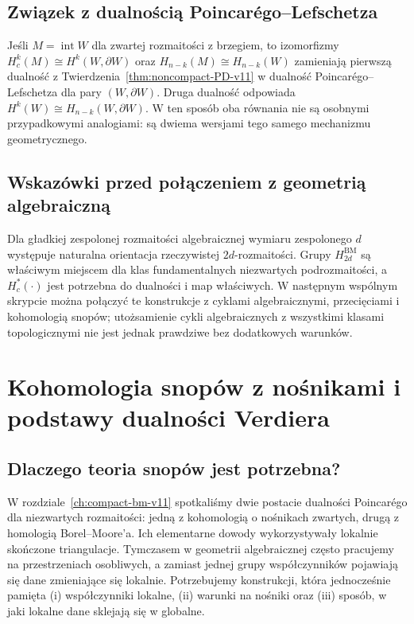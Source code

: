 \documentclass[11pt,a4paper,oneside]{report}
\theoremstyle{plain}
\theoremstyle{definition}
\theoremstyle{remark}
\begin{document}
\section{Związek z dualnością Poincarégo--Lefschetza}
Jeśli $M=\operatorname{int}W$ dla zwartej rozmaitości
z brzegiem, to izomorfizmy
$H_c^k(M)\cong H^k(W,\partial W)$ oraz
$H_{n-k}(M)\cong H_{n-k}(W)$
zamieniają pierwszą dualność z
Twierdzenia~\ref{thm:noncompact-PD-v11}
w dualność Poincarégo--Lefschetza dla pary
$(W,\partial W)$. Druga dualność odpowiada
$H^k(W)\cong H_{n-k}(W,\partial W)$.
W ten sposób oba równania nie są osobnymi
przypadkowymi analogiami: są dwiema wersjami
tego samego mechanizmu geometrycznego.

\section{Wskazówki przed połączeniem z geometrią algebraiczną}
Dla gładkiej zespolonej rozmaitości algebraicznej
wymiaru zespolonego $d$ występuje naturalna orientacja
rzeczywistej $2d$-rozmaitości. Grupy
$H_{2d}^{\mathrm{BM}}$ są właściwym miejscem dla klas
fundamentalnych niezwartych podrozmaitości, a
$H_c^*(\cdot)$ jest potrzebna do dualności i map
właściwych. W następnym wspólnym skrypcie można
połączyć te konstrukcje z cyklami algebraicznymi,
przecięciami i kohomologią snopów; utożsamienie
cykli algebraicznych z wszystkimi klasami topologicznymi
nie jest jednak prawdziwe bez dodatkowych warunków.


\chapter{Kohomologia snopów z nośnikami i podstawy dualności Verdiera}
\label{ch:snopy-verdier-v12}

\section{Dlaczego teoria snopów jest potrzebna?}
W rozdziale~\ref{ch:compact-bm-v11} spotkaliśmy dwie postacie dualności
Poincarégo dla niezwartych rozmaitości: jedną z kohomologią o nośnikach
zwartych, drugą z homologią Borel--Moore'a. Ich elementarne dowody
wykorzystywały lokalnie skończone triangulacje. Tymczasem w geometrii
algebraicznej często pracujemy na przestrzeniach osobliwych, a zamiast
jednej grupy współczynników pojawiają się dane zmieniające się lokalnie.
Potrzebujemy konstrukcji, która jednocześnie pamięta (i) współczynniki
lokalne, (ii) warunki na nośniki oraz (iii) sposób, w jaki lokalne
dane sklejają się w globalne.
\end{document}
